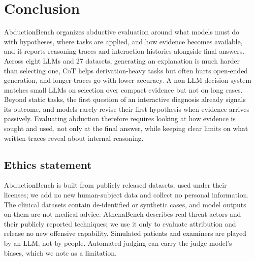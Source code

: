 \section{Conclusion}
\label{sec:conclusion}

AbductionBench organizes abductive evaluation around what models must do with hypotheses, where tasks are applied, and how evidence becomes available, and it reports reasoning traces and interaction histories alongside final answers. Across eight LLMs and 27 datasets, generating an explanation is much harder than selecting one, CoT helps derivation-heavy tasks but often hurts open-ended generation, and longer traces go with lower accuracy. A non-LLM decision system matches small LLMs on selection over compact evidence but not on long cases. Beyond static tasks, the first question of an interactive diagnosis already signals its outcome, and models rarely revise their first hypothesis when evidence arrives passively. Evaluating abduction therefore requires looking at how evidence is sought and used, not only at the final answer, while keeping clear limits on what written traces reveal about internal reasoning.

\subsection*{Ethics statement}

AbductionBench is built from publicly released datasets, used under their licenses; we add no new human-subject data and collect no personal information. The clinical datasets contain de-identified or synthetic cases, and model outputs on them are not medical advice. AthenaBench describes real threat actors and their publicly reported techniques; we use it only to evaluate attribution and release no new offensive capability. Simulated patients and examiners are played by an LLM, not by people. Automated judging can carry the judge model's biases, which we note as a limitation.

